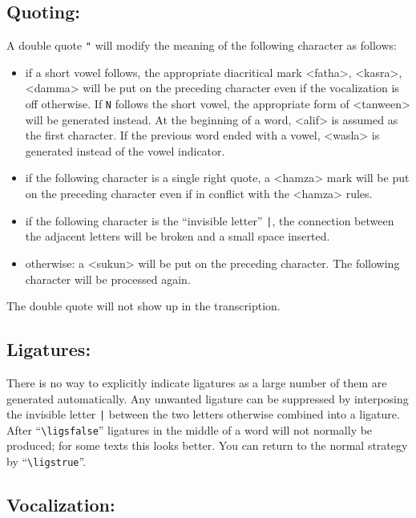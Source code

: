 \documentclass[pagesize=auto]{scrartcl}
\newcommand*{\symb}[1]{\textsf{\textlangle#1\textrangle}}
\def\symb#1{<#1>}%
\begin{document}
\subsection{Quoting:}

A double quote \verb+"+ will modify the meaning of the following character as 
follows: 
%
\begin{itemize}
\item if a short vowel follows, the appropriate diacritical mark \symb{fatha}, 
  \symb{kasra}, \symb{damma} will be put on the preceding character even if the
  vocalization is off otherwise. If \verb+N+ follows the short vowel, the 
  appropriate form of \symb{tanween} will be generated instead. At the 
  beginning of a word, \symb{alif} is assumed as the first character. If the 
  previous word ended with a vowel, \symb{wasla} is generated instead of the 
  vowel indicator. 
\item if the following character is a single right quote, a \symb{hamza} mark will 
  be put on the preceding character even if in conflict with the \symb{hamza} 
  rules. 
\item if the following character is the ``invisible letter'' \verb+|+, the connection 
  between the adjacent letters will be broken and a small space inserted.
\item otherwise: a \symb{sukun} will be put on the preceding character. The 
  following character will be processed again.
\end{itemize}
%
The double quote will not show up in the transcription.


\subsection{Ligatures:}

There is no way to explicitly indicate ligatures as a large number of them 
are generated automatically. Any unwanted ligature can be suppressed by 
interposing the invisible letter \verb+|+ between the two letters otherwise 
combined into a ligature. After ``\verb+\ligsfalse+'' ligatures in the middle of a 
word will not normally be produced; for some texts this looks better. You 
can return to the normal strategy by ``\verb+\ligstrue+''. 


\subsection{Vocalization:}
\end{document}
